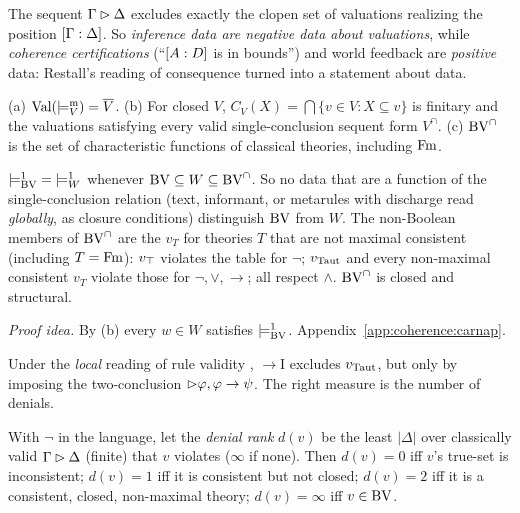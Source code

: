 The sequent $\Gamma\rhd\Delta$ excludes exactly the clopen set of valuations realizing the position $[\Gamma : \Delta]$. So \emph{inference data are negative data about valuations}, while \emph{coherence certifications} (``$[A : D]$ is in bounds'') and world feedback are \emph{positive} data: Restall's reading of consequence \citep{restall2005multiple} turned into a statement about data.

\begin{lemma}[Duality]\label{lem:coherence:duality}
\textup{(a)} $\mathrm{Val}(\models^{\mathrm m}_V)=\overline V$. \textup{(b)} For closed $V$, $C_V(X)=\bigcap\{v\in V:X\subseteq v\}$ is finitary and the valuations satisfying every valid single-conclusion sequent form $V^\cap$. \textup{(c)} $\mathrm{BV}^\cap$ is the set of characteristic functions of classical theories, including $\mathrm{Fm}$. \hfill{}\ \ 
\end{lemma}

\begin{theorem}\label{thm:coherence:carnap}
${\models^1_{\mathrm{BV}}}={\models^1_W}$ whenever $\mathrm{BV}\subseteq W\subseteq\mathrm{BV}^\cap$. So no data that are a function of the single-conclusion relation (text, informant, or metarules with discharge read \emph{globally}, as closure conditions) distinguish $\mathrm{BV}$ from $W$. The non-Boolean members of $\mathrm{BV}^\cap$ are the $v_T$ for theories $T$ that are not maximal consistent (including $T=\mathrm{Fm}$): $v_{\top}$ violates the table for $\neg$; $v_{\mathrm{Taut}}$ and every non-maximal consistent $v_T$ violate those for $\neg,\vee,\to$; all respect $\wedge$. $\mathrm{BV}^\cap$ is closed and structural. \hfill{}
\end{theorem}

\noindent\emph{Proof idea.} By (b) every $w\in W$ satisfies $\models^1_{\mathrm{BV}}$. Appendix~\ref{app:coherence:carnap}.

Under the \emph{local} reading of rule validity \citep{garson2013what}, $\to$I excludes $v_{\mathrm{Taut}}$, but only by imposing the two-conclusion $\rhd\varphi,\varphi\to\psi$. The right measure is the number of denials.

\begin{theorem}\label{thm:coherence:rank}
With $\neg$ in the language, let the \emph{denial rank} $d(v)$ be the least $|\Delta|$ over classically valid $\Gamma\rhd\Delta$ (finite) that $v$ violates ($\infty$ if none). Then $d(v)=0$ iff $v$'s true-set is inconsistent; $d(v)=1$ iff it is consistent but not closed; $d(v)=2$ iff it is a consistent, closed, non-maximal theory; $d(v)=\infty$ iff $v\in\mathrm{BV}$. \hfill{}
\end{theorem}

